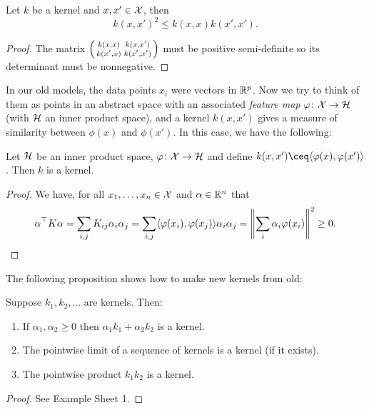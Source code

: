 \begin{proposition} \label{prop:kernel_cs}
    Let $k$ be a kernel and $x, x' \in \mathcal X$, then 
    \[
    k(x, x')^2 \leq k(x, x) k(x', x'). 
    \]
\end{proposition}

\begin{proof}
    The matrix $\smqty(k(x, x) & k(x, x') \\ k(x', x) & k(x', x'))$ must be positive semi-definite so its determinant must be non\-negative. 
\end{proof}

In our old models, the data points $x_i$ were vectors in $\mathbb R^p$. Now we try to think of them as points in an abstract space with an associated \emph{feature map} $\varphi \colon \mathcal X \to \mathcal H$ (with $\mathcal H$ an inner product space), and a kernel $k(x, x')$ gives a measure of similarity between $\phi(x)$ and $\phi(x')$. In this case, we have the following: 
\begin{proposition} \label{prop:ip_kernel}
    Let $\mathcal H$ be an inner product space,  $\varphi \colon \mathcal X \to \mathcal H$ and define $k(x, x') \ceq \ang{\phi(x), \phi(x')}$. Then $k$ is a kernel. 
\end{proposition}

\begin{proof}
    We have, for all $x_1, \dotsc, x_n \in \mathcal X$ and $\alpha \in \mathbb R^n$ that
    \[
    \alpha^\top K \alpha = \sum_{i, j} K_{ij} \alpha_i \alpha_j = \sum_{i, j} \langle\varphi(x_i), \varphi(x_j)\rangle \alpha_i \alpha_j = \norm{\sum_i \alpha_i \varphi(x_i)}^2 \geq 0. 
    \]
\end{proof}

The following proposition shows how to make new kernels from old:
\begin{proposition}
    Suppose $k_1, k_2, \dotsc$ are kernels. Then:
    \begin{enumerate}
        \item If $\alpha_1, \alpha_2 \geq 0$ then $\alpha_1 k_1 + \alpha_2 k_2$ is a kernel.
        \item The pointwise limit of a sequence of kernels is a kernel (if it exists). 
        \item The pointwise product $k_1 k_2$ is a kernel. 
    \end{enumerate}
\end{proposition}

\begin{proof}
    See Example Sheet 1. 
\end{proof}

